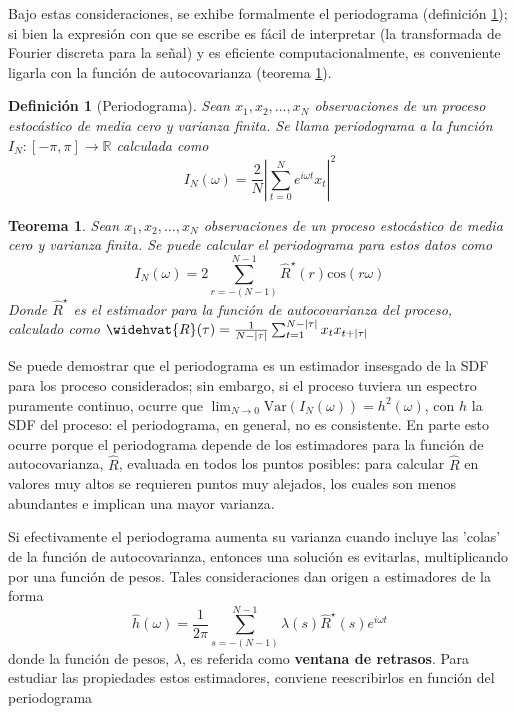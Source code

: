 \documentclass[12pt,a4paper]{mitthesis}
\newtheorem{defn}{Definici\'on}
\newtheorem{thrm}{Teorema}
\newcommand{\R}{\mathbb{R}}
\newcommand{\aste}[1]{\widehat{ #1 }^{\star}}
\newcommand{\est}[1]{\widehat{ #1 }}
\newcommand{\COS}[1]{\mathrm{cos}\left( #1 \right)}
\newcommand{\Var}[1]{\mathrm{Var}\left( #1 \right)}
\newcommand{\abso}[1]{\left| #1 \right|}
\begin{document}
Bajo estas consideraciones, se exhibe formalmente el periodograma (definici\'on 
\ref{periodograma}); si bien la expresi\'on con que se escribe es f\'acil de interpretar (la 
transformada de Fourier discreta para la se\~nal) y es eficiente computacionalmente, es conveniente
ligarla con la funci\'on de autocovarianza (teorema \ref{periodograma_rho}).

\begin{defn}[Periodograma]
Sean $x_1, x_2 , \dots, x_N$ observaciones de un proceso estoc\'astico de media cero y varianza
finita. Se llama periodograma a la funci\'on $I_N: [-\pi,\pi] \rightarrow \R$ calculada como
\begin{equation*}
I_N(\omega) = \frac{2}{N} \abso{ \sum_{t=0}^{N} e^{i \omega t} x_t }^{2}
\end{equation*}
\label{periodograma}
\end{defn}

\begin{thrm}
Sean $x_1, x_2 , \dots, x_N$ observaciones de un proceso estoc\'astico de media cero y varianza
finita. Se puede calcular el periodograma para estos datos como
\begin{equation*}
I_N(\omega) = 2 \sum_{r = -(N-1)}^{N-1} \aste{R}(r) \COS{r \omega}
\end{equation*}
Donde $\aste{R}$ es el estimador para la funci\'on de autocovarianza del proceso, calculado como
$\widehvat{R}(\tau) = \frac{1}{N-\abso{\tau}} \sum_{t = 1}^{N-\abso{\tau}} x_t x_{t+\abso{\tau}}$
\label{periodograma_rho}
\end{thrm}

Se puede demostrar que el periodograma es un estimador insesgado de la SDF para los proceso 
considerados; sin embargo, si el proceso tuviera un espectro puramente continuo, ocurre que 
$\lim_{N\rightarrow 0} \Var{I_N(\omega)} = h^{2}(\omega)$, con $h$ la SDF del proceso: el 
periodograma, en general, no es consistente.
En parte esto ocurre porque el periodograma depende de los estimadores para la funci\'on de 
autocovarianza, $\est{R}$, evaluada en todos los puntos posibles: para calcular $\est{R}$ en 
valores muy altos se requieren puntos muy alejados, los cuales son menos abundantes e implican 
una mayor varianza.

Si efectivamente el periodograma aumenta su varianza cuando incluye las 'colas' de la funci\'on de 
autocovarianza, entonces una soluci\'on es evitarlas, multiplicando por una funci\'on de pesos. 
Tales consideraciones dan origen a estimadores de la forma
\begin{equation*}
\est{h}(\omega) = \frac{1}{2\pi} \sum_{s = -(N-1)}^{N-1} 
\lambda(s) \aste{R}(s) e^{i \omega t}
\label{ventaneando}
\end{equation*}
donde la funci\'on de pesos, $\lambda$, es referida como \textbf{ventana de retrasos}. Para 
estudiar las propiedades estos estimadores, conviene reescribirlos en funci\'on del periodograma
\end{document}
